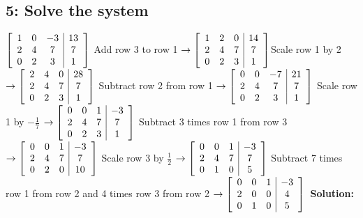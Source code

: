 \documentclass{article}
\begin{document}
\subsection*{5: Solve the system}
$\left[\begin{array}{ccc|c}
1 & 0 & -3 & 13 \\
2 & 4 & 7 & 7 \\ 
0 & 2 & 3 & 1  
\end{array}\right] \\[0.1in]$ Add row 3 to row 1 
$\rightarrow \left[\begin{array}{ccc|c}
1 & 2 & 0 & 14 \\
2 & 4 & 7 & 7 \\ 
0 & 2 & 3 & 1  
\end{array}\right] \\[0.1in]
$Scale row 1 by 2
$\rightarrow \left[\begin{array}{ccc|c}
2 & 4 & 0 & 28 \\
2 & 4 & 7 & 7 \\ 
0 & 2 & 3 & 1  
\end{array}\right] \\[0.1in]
$
Subtract row 2 from row 1
$\rightarrow \left[\begin{array}{ccc|c}
0 & 0 & -7 & 21 \\
2 & 4 & 7 & 7 \\ 
0 & 2 & 3 & 1  
\end{array}\right] \\[0.1in]
$
Scale row 1 by $-\frac{1}{7}$
$\rightarrow \left[\begin{array}{ccc|c}
0 & 0 & 1 & -3 \\
2 & 4 & 7 & 7 \\ 
0 & 2 & 3 & 1  
\end{array}\right] \\[0.1in]
$
Subtract 3 times row 1 from row 3
$\rightarrow \left[\begin{array}{ccc|c}
0 & 0 & 1 & -3 \\
2 & 4 & 7 & 7 \\ 
0 & 2 & 0 & 10  
\end{array}\right] \\[0.1in]
$
Scale row 3 by $\frac{1}{2}$
$\rightarrow \left[\begin{array}{ccc|c}
0 & 0 & 1 & -3 \\
2 & 4 & 7 & 7 \\ 
0 & 1 & 0 & 5  
\end{array}\right] \\[0.1in]
$ Subtract 7 times row 1 from row 2 and 4 times row 3 from row 2
$\rightarrow \left[\begin{array}{ccc|c}
0 & 0 & 1 & -3 \\
2 & 0 & 0 & 4 \\ 
0 & 1 & 0 & 5  
\end{array}\right] \\
$ 
\textbf{Solution: } 
\end{document}
